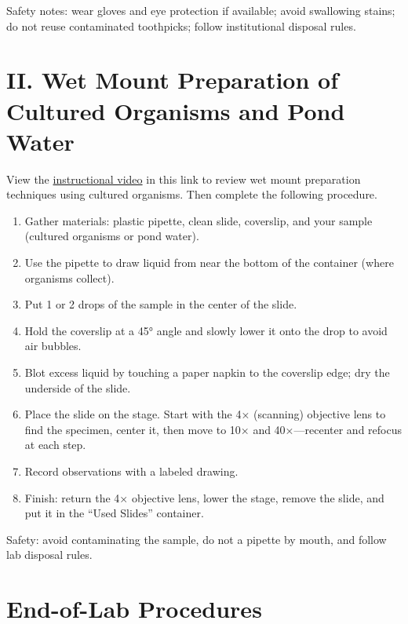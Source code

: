 \documentclass[
  letterpaper,
  DIV=11,
  numbers=noendperiod]{scrreprt}
\begin{document}
Safety notes: wear gloves and eye protection if available; avoid
swallowing stains; do not reuse contaminated toothpicks; follow
institutional disposal rules.

\section{\texorpdfstring{\textbf{II. Wet Mount Preparation of Cultured
Organisms and Pond
Water}}{II. Wet Mount Preparation of Cultured Organisms and Pond Water}}\label{ii.-wet-mount-preparation-of-cultured-organisms-and-pond-water}

View the
\href{https://youtube.com/shorts/LK0pcHcDECM?si=3KZ6yQL6nSKEaIQY}{instructional
video} in this link to review wet mount preparation techniques using
cultured organisms. Then complete the following procedure.

\begin{enumerate}
\def\labelenumi{\arabic{enumi}.}
\item
  Gather materials: plastic pipette, clean slide, coverslip, and your
  sample (cultured organisms or pond water).
\item
  Use the pipette to draw liquid from near the bottom of the container
  (where organisms collect).
\item
  Put 1 or 2 drops of the sample in the center of the slide.
\item
  Hold the coverslip at a 45° angle and slowly lower it onto the drop to
  avoid air bubbles.
\item
  Blot excess liquid by touching a paper napkin to the coverslip edge;
  dry the underside of the slide.
\item
  Place the slide on the stage. Start with the 4× (scanning) objective
  lens to find the specimen, center it, then move to 10× and
  40×---recenter and refocus at each step.
\item
  Record observations with a labeled drawing.
\item
  Finish: return the 4× objective lens, lower the stage, remove the
  slide, and put it in the ``Used Slides'' container.
\end{enumerate}

Safety: avoid contaminating the sample, do not a pipette by mouth, and
follow lab disposal rules.

\section{\texorpdfstring{\textbf{End-of-Lab
Procedures}}{End-of-Lab Procedures}}\label{end-of-lab-procedures}
\end{document}
